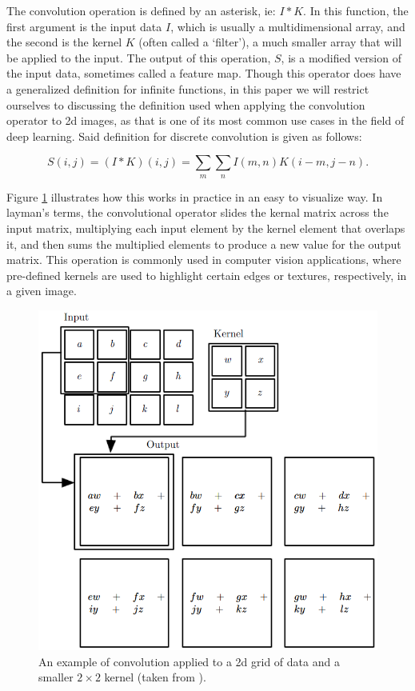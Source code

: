 \documentclass[11pt,a4paper,oldfontcommands]{memoir}
\begin{document}
The convolution operation is defined by an asterisk, ie: $I * K$. In this function, the first argument is the input data $I$, which is usually a multidimensional array, and the second is the kernel $K$ (often called a `filter'), a much smaller array that will be applied to the input. The output of this operation, $S$, is a modified version of the input data, sometimes called a feature map. Though this operator does have a generalized definition for infinite functions, in this paper we will restrict ourselves to discussing the definition used when applying the convolution operator to 2d images, as that is one of its most common use cases in the field of deep learning. Said definition for discrete convolution is given as follows:

\begin{equation}
    S(i, j) = (I * K)(i,j) = \sum \limits_m \sum \limits_n I(m, n) K(i - m, j - n) .
    \label{eq:conv_1}
\end{equation}

Figure \ref{fig:conv_example} illustrates how this works in practice in an easy to visualize way. In layman's terms, the convolutional operator slides the kernal matrix across the input matrix, multiplying each input element by the kernel element that overlaps it, and then sums the multiplied elements to produce a new value for the output matrix. This operation is commonly used in computer vision applications, where pre-defined kernels are used to highlight certain edges or textures, respectively, in a given image. 

\begin{figure}
    \centering
    \includegraphics[width=40em]{Images/conv_example.PNG}
    \caption{An example of convolution applied to a 2d grid of data and a smaller $2 \times 2$ kernel (taken from \cite{dl_book}).}
    \label{fig:conv_example}
\end{figure}
\end{document}
